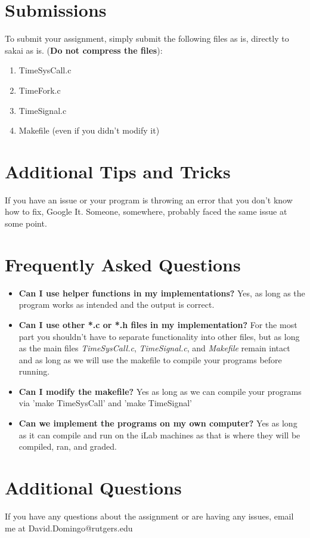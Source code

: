 \documentclass{article}
\begin{document}
\section*{Submissions}
To submit your assignment, simply submit the following files as is, directly to sakai as is. (\textbf{Do not compress the files}):
\begin{enumerate}
\item TimeSysCall.c
\item TimeFork.c
\item TimeSignal.c
\item Makefile (even if you didn't modify it)
\end{enumerate}

\section*{Additional Tips and Tricks}

\begin{info}
If you have an issue or your program is throwing an error that you don't know how to fix, Google It. Someone, somewhere, probably faced the same issue at some point.
\end{info}

\section*{Frequently Asked Questions}
\begin{itemize}
\item \textbf{Can I use helper functions in my implementations?} Yes, as long as the program works as intended and the output is correct. 
\item \textbf{Can I use other *.c or *.h files in my implementation?} For the most part you shouldn't have to separate functionality into other files, but as long as the main files \textit{TimeSysCall.c}, \textit{TimeSignal.c}, and \textit{Makefile} remain intact and as long as we will use the makefile to compile your programs before running.
\item \textbf{Can I modify the makefile?} Yes as long as we can compile your programs via 'make TimeSysCall' and 'make TimeSignal' 
\item \textbf{Can we implement the programs on my own computer?} Yes as long as it can compile and run on the iLab machines as that is where they will be compiled, ran, and graded. 
\end{itemize}

\section*{Additional Questions}
If you have any questions about the assignment or are having any issues, email me at David.Domingo@rutgers.edu
\end{document}
